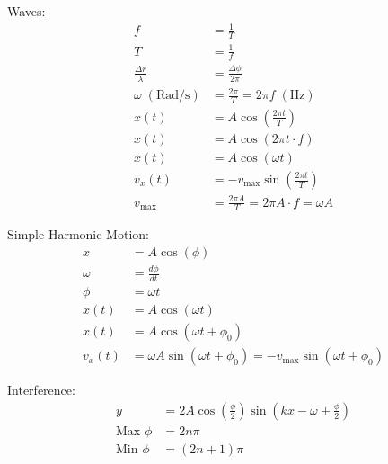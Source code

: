 \documentclass[10pt, letterpaper]{book}
\begin{document}
\begin{multicols*}{2}
        Waves:
        \begin{align}
            f   & = \frac{1}{T}                         \\
            T   & = \frac{1}{f}                         \\
            \frac{\Delta r}{\lambda} 
                & = \frac{\Delta \phi}{2\pi}            \\
            \omega \; (\text{Rad/s})
                & = \frac{2\pi}{T} = 2\pi f\;(\text{Hz})\\
            x(t)& = A\cos\left(\frac{2 \pi t}{T}\right) \\
            x(t)& = A\cos(2\pi t\cdot f)                \\
            x(t)& = A\cos(\omega t)                     \\      
            v_{x}(t)
                & = -v_{\text{max}}
                    \sin\left(\frac{2\pi t}{T}\right)   \\    
            v_{\text{max}}
                & = \frac{2\pi A}{T} = 2\pi A \cdot f
                  = \omega A    
        \end{align}

        Simple Harmonic Motion:
        \begin{align}
            x       & = A\cos(\phi)                 \\
            \omega  & = \frac{d\phi}{dt}            \\
            \phi    & = \omega t                    \\
            x(t)    & = A\cos(\omega t)             \\
            x(t)    & = A\cos(\omega t + \phi_{0})  \\
            v_{x}(t)& = \omega A\sin(\omega t + \phi_{0})
                      = -v_{\text{max}}
                        \sin(\omega t + \phi_{0})
        \end{align}

        Interference:
        \begin{align}
            y   & = 2A\cos\left(\frac{\phi}{2}\right)
                    \sin\left(kx-\omega+\frac{\phi}{2}\right)       \\
            \text{Max } \phi
                & = 2n\pi                                           \\      
            \text{Min } \phi
                & = (2n+1)\pi                                       
        \end{align}

   \end{multicols*}
\end{document}
